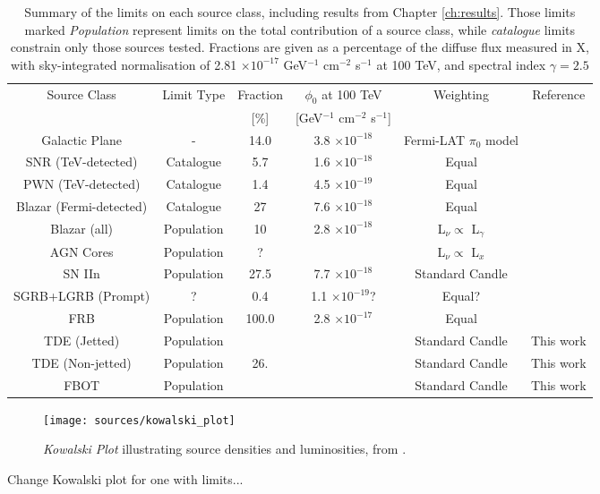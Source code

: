 \begin{table*}[]
	\centering
	\begin{tabular}{|c c c c c c|} 
		\hline
		Source Class & Limit Type & Fraction & $\phi_{0}$ at 100 TeV & Weighting & Reference\\ 
		&&[\%]&[GeV$^{-1}$ cm$^{-2}$ s$^{-1}$]&&\\
		\hline
		Galactic Plane & - & 14.0 &  3.8 $\times 10^{-18}$  & Fermi-LAT $\pi_{0}$ model &\cite{ic_17_galactic}\\
		SNR (TeV-detected) & Catalogue & 5.7 & 1.6  $\times 10^{-18}$ & Equal & \cite{ic_17_galactic}\\
		PWN (TeV-detected) & Catalogue & 1.4 & 4.5 $\times 10^{-19}$ & Equal &  \cite{ic_20_pwn}\\
		\hline
		Blazar (Fermi-detected) & Catalogue & 27&7.6 $\times 10^{-18}$& Equal & \cite{ic_blazar_17}\\
		Blazar (all) & Population &10&2.8 $\times 10^{-18}$& L$_{\nu} \propto$ L$_{\gamma}$& \cite{ic_blazar_17}\\
		AGN Cores & Population &?&& L$_{\nu} \propto$ L$_{x}$&\\
		SN IIn & Population & 27.5 &7.7 $\times 10^{-18}$&Standard Candle&\cite{Stasik2018Search}\\
		SGRB+LGRB (Prompt) & ? & 0.4 &1.1 $\times 10^{-19}$?&Equal?&\cite{ic_grb_17}\\
		FRB & Population & 100.0 & 2.8 $\times 10^{-17}$& Equal & \cite{ic_frb_20}\\
		TDE (Jetted) &Population&& &Standard Candle & This work\\
		TDE (Non-jetted) & Population &26.& &Standard Candle & This work\\
		FBOT & Population &&& Standard Candle & This work\\
		\hline
	\end{tabular}
	\caption{Summary of the limits on each source class, including results from Chapter \ref{ch:results}. Those limits marked \emph{Population} represent limits on the total contribution of a source class, while \emph{catalogue} limits constrain only those sources tested. Fractions are given as a percentage of the diffuse flux measured in X, with sky-integrated normalisation of 2.81 $\times 10^{-17}$ GeV$^{-1}$ cm$^{-2}$ s$^{-1}$ at 100 TeV, and spectral index $\gamma=2.5$}
	\label{tab:source_limits}
\end{table*}{}

\begin{figure}[!ht]
	\centering \texttt{[image: sources/kowalski\_plot]}
	\caption{\emph{Kowalski Plot} illustrating source densities and luminosities, from \cite{ic_gen2_20}.}
	\label{fig:kowalski_plot}
\end{figure}

Change Kowalski plot for one with limits...